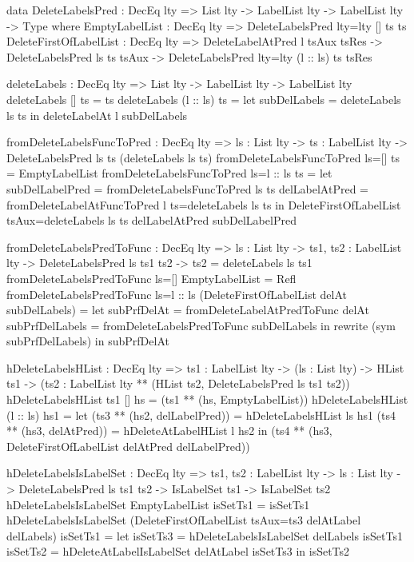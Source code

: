 \begin{code}
data DeleteLabelsPred : DecEq lty => List lty -> 
  LabelList lty -> LabelList lty -> Type where
  EmptyLabelList : DecEq lty => 
    DeleteLabelsPred {lty=lty} [] ts ts
  DeleteFirstOfLabelList : DecEq lty => 
    DeleteLabelAtPred l tsAux tsRes -> 
    DeleteLabelsPred ls ts tsAux ->
    DeleteLabelsPred {lty=lty} (l :: ls) ts tsRes
    
deleteLabels : DecEq lty => List lty -> LabelList lty -> 
  LabelList lty
deleteLabels [] ts = ts
deleteLabels (l :: ls) ts = 
  let subDelLabels = deleteLabels ls ts
  in deleteLabelAt l subDelLabels

fromDeleteLabelsFuncToPred : DecEq lty => {ls : List lty} -> 
  {ts : LabelList lty} -> 
  DeleteLabelsPred ls ts (deleteLabels ls ts)    
fromDeleteLabelsFuncToPred {ls=[]} {ts} = EmptyLabelList
fromDeleteLabelsFuncToPred {ls=l :: ls} {ts} = 
  let subDelLabelPred = fromDeleteLabelsFuncToPred {ls} {ts}
      delLabelAtPred = 
        fromDeleteLabelAtFuncToPred {l} {ts=deleteLabels ls ts}
  in DeleteFirstOfLabelList {tsAux=deleteLabels ls ts} 
       delLabelAtPred subDelLabelPred
    
fromDeleteLabelsPredToFunc : DecEq lty => {ls : List lty} -> 
  {ts1, ts2 : LabelList lty} -> DeleteLabelsPred ls ts1 ts2 ->
  ts2 = deleteLabels ls ts1
fromDeleteLabelsPredToFunc {ls=[]} EmptyLabelList = Refl
fromDeleteLabelsPredToFunc {ls=l :: ls} 
  (DeleteFirstOfLabelList delAt subDelLabels) = 
  let subPrfDelAt = fromDeleteLabelAtPredToFunc delAt
      subPrfDelLabels = fromDeleteLabelsPredToFunc subDelLabels
  in rewrite (sym subPrfDelLabels) in subPrfDelAt    
    
hDeleteLabelsHList : DecEq lty => {ts1 : LabelList lty} -> 
  (ls : List lty) -> HList ts1 ->
  (ts2 : LabelList lty ** (HList ts2, DeleteLabelsPred ls ts1 ts2))
hDeleteLabelsHList {ts1} [] hs = (ts1 ** (hs, EmptyLabelList))
hDeleteLabelsHList (l :: ls) hs1 = 
  let (ts3 ** (hs2, delLabelPred)) = hDeleteLabelsHList ls hs1
      (ts4 ** (hs3, delAtPred)) = hDeleteAtLabelHList l hs2
  in (ts4 ** (hs3, DeleteFirstOfLabelList delAtPred delLabelPred))

hDeleteLabelsIsLabelSet : DecEq lty => 
  {ts1, ts2 : LabelList lty} -> {ls : List lty} -> 
  DeleteLabelsPred ls ts1 ts2 ->
  IsLabelSet ts1 -> IsLabelSet ts2
hDeleteLabelsIsLabelSet EmptyLabelList isSetTs1 = isSetTs1
hDeleteLabelsIsLabelSet (DeleteFirstOfLabelList {tsAux=ts3} 
  delAtLabel delLabels) isSetTs1 = 
  let isSetTs3 = hDeleteLabelsIsLabelSet delLabels isSetTs1
      isSetTs2 = hDeleteAtLabelIsLabelSet delAtLabel isSetTs3
  in isSetTs2
  

\end{code}
